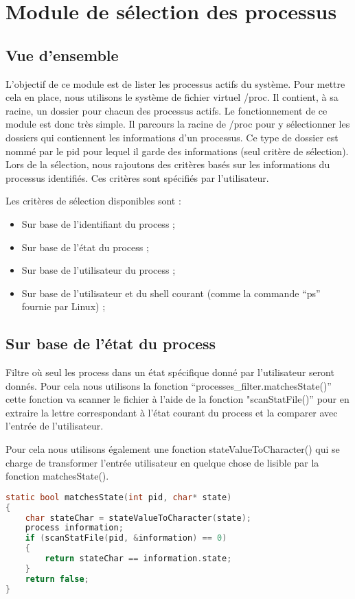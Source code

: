\section{Module de sélection des processus}
\subsection{Vue d'ensemble}
L'objectif de ce module est de lister les processus actifs du système. Pour mettre cela en place, nous utilisons le système de fichier virtuel /proc. Il contient, à sa racine, un dossier pour chacun des processus actifs. Le fonctionnement de ce module est donc très simple. Il parcours la racine de /proc pour y sélectionner les dossiers qui contiennent les informations d'un processus. Ce type de dossier est nommé par le pid pour lequel il garde des informations (seul critère de sélection). Lors de la sélection, nous rajoutons des critères basés sur les informations du processus identifiés. Ces critères sont spécifiés par l'utilisateur.

Les critères de sélection disponibles sont :

\begin{itemize}
\item Sur base de l'identifiant du process ;
\item Sur base de l’état du process ;
\item Sur base de l’utilisateur du process ;
\item Sur base de l’utilisateur et du shell courant (comme la commande “ps” 
fournie par Linux) ;
\end{itemize}

\subsection{Sur base de l'état du process} 
Filtre où seul les process dans un état spécifique donné par l’utilisateur seront donnés. Pour cela nous utilisons la fonction “processes_filter.matchesState()” cette fonction va scanner le fichier à l’aide de la fonction "scanStatFile()” pour en extraire la lettre correspondant à l’état courant du process et la comparer avec l’entrée de l’utilisateur.

Pour cela nous utilisons également une fonction  stateValueToCharacter() qui se charge de transformer l'entrée utilisateur en quelque chose de lisible par la fonction matchesState().

\begin{lstlisting}[frame=single, language=c]
static bool matchesState(int pid, char* state)
{
    char stateChar = stateValueToCharacter(state);
    process information;
    if (scanStatFile(pid, &information) == 0)
    {
        return stateChar == information.state;
    }
    return false;
}
\end{lstlisting}

